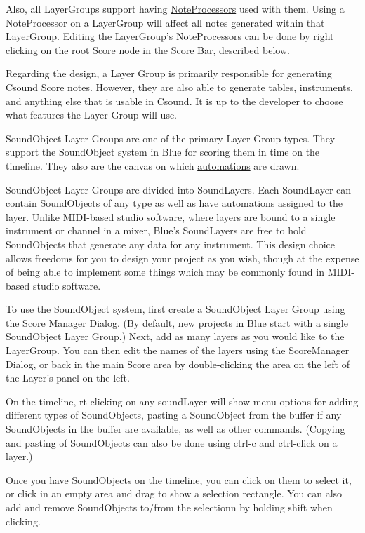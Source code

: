 Also, all LayerGroups support having
\protect\hyperlink{noteProcessors}{NoteProcessors} used with them. Using
a NoteProcessor on a LayerGroup will affect all notes generated within
that LayerGroup. Editing the LayerGroup's NoteProcessors can be done by
right clicking on the root Score node in the
\protect\hyperlink{scoreBar}{Score Bar}, described below.

Regarding the design, a Layer Group is primarily responsible for
generating Csound Score notes. However, they are also able to generate
tables, instruments, and anything else that is usable in Csound. It is
up to the developer to choose what features the Layer Group will use.

SoundObject Layer Groups are one of the primary Layer Group types. They
support the SoundObject system in Blue for scoring them in time on the
timeline. They also are the canvas on which
\protect\hyperlink{parameterAutomation}{automations} are drawn.

SoundObject Layer Groups are divided into SoundLayers. Each SoundLayer
can contain SoundObjects of any type as well as have automations
assigned to the layer. Unlike MIDI-based studio software, where layers
are bound to a single instrument or channel in a mixer, Blue's
SoundLayers are free to hold SoundObjects that generate any data for any
instrument. This design choice allows freedoms for you to design your
project as you wish, though at the expense of being able to implement
some things which may be commonly found in MIDI-based studio software.

To use the SoundObject system, first create a SoundObject Layer Group
using the Score Manager Dialog. (By default, new projects in Blue start
with a single SoundObject Layer Group.) Next, add as many layers as you
would like to the LayerGroup. You can then edit the names of the layers
using the ScoreManager Dialog, or back in the main Score area by
double-clicking the area on the left of the Layer's panel on the left.

On the timeline, rt-clicking on any soundLayer will show menu options
for adding different types of SoundObjects, pasting a SoundObject from
the buffer if any SoundObjects in the buffer are available, as well as
other commands. (Copying and pasting of SoundObjects can also be done
using ctrl-c and ctrl-click on a layer.)

Once you have SoundObjects on the timeline, you can click on them to
select it, or click in an empty area and drag to show a selection
rectangle. You can also add and remove SoundObjects to/from the
selectionn by holding shift when clicking.

